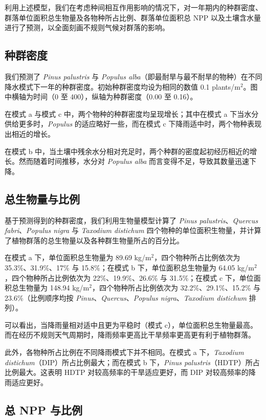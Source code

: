 \documentclass[11pt,a4paper]{ctexart}
\begin{document}
利用上述模型，我们在考虑种间相互作用影响的情况下，对一年期内的种群密度、群落单位面积总生物量及各物种所占比例、群落单位面积总 NPP 以及土壤含水量进行了预测，以全面刻画不规则气候对群落的影响。

\subsection{种群密度}

我们预测了 \textit{Pinus palustris} 与 \textit{Populus alba}（即最耐旱与最不耐旱的物种）在不同降水模式下一年的种群密度。初始种群密度均设为相同的数值 0.1 plants/m$^2$。图中横轴为时间（0 至 400），纵轴为种群密度（0.00 至 0.16）。

在模式 a 与模式 c 中，两个物种的种群密度均呈现增长；其中在模式 a 下当水分供给更多时，\textit{Populus} 的适应略好一些，而在模式 c 下降雨适中时，两个物种表现出相近的增长。

在模式 b 中，当土壤中残余水分相对充足时，两个种群的密度起初经历相近的增长。然而随着时间推移，水分对 \textit{Populus alba} 而言变得不足，导致其数量迅速下降。

\subsection{总生物量与比例}

基于预测得到的种群密度，我们利用生物量模型计算了 \textit{Pinus palustris}、\textit{Quercus fabri}、\textit{Populus nigra} 与 \textit{Taxodium distichum} 四个物种的单位面积生物量，并计算了植物群落的总生物量以及各种群生物量所占的百分比。

在模式 a 下，单位面积总生物量为 89.69 kg/m$^2$，四个物种所占比例依次为 35.3\%、31.9\%、17\% 与 15.8\%；在模式 b 下，单位面积总生物量为 64.05 kg/m$^2$，四个物种所占比例依次为 22\%、19.9\%、26.6\% 与 31.5\%；在模式 c 下，单位面积总生物量为 148.94 kg/m$^2$，四个物种所占比例依次为 32.2\%、29.1\%、15.2\% 与 23.6\%（比例顺序均按 \textit{Pinus}、\textit{Quercus}、\textit{Populus nigra}、\textit{Taxodium distichum} 排列）。

可以看出，当降雨量相对适中且更为平稳时（模式 c），单位面积总生物量最高。而在经历不规则天气周期时，降雨频率更高比干旱频率更高更有利于植物群落。

此外，各物种所占比例在不同降雨模式下并不相同。在模式 a 下，\textit{Taxodium distichum}（DIP）所占比例最大；而在模式 b 下，\textit{Pinus palustris}（HDTP）所占比例最大。这表明 HDTP 对较高频率的干旱适应更好，而 DIP 对较高频率的降雨适应更好。

\subsection{总 NPP 与比例}
\end{document}
